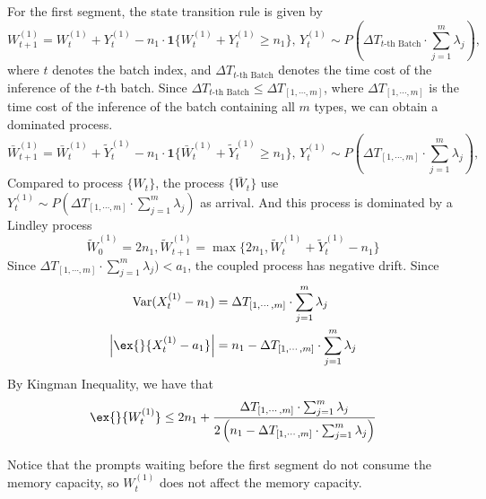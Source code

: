 For the first segment, the state transition rule is given by
$$ W_{t+1}^{(1)} =  W_t^{(1)} + Y_t^{(1)} -n_1\cdot  \mathbf{1}\{ W_t^{(1)} + Y_t^{(1)}\geq n_1 \},\, Y_t^{(1)}\sim P(\Delta T_{ t\text{-th Batch} }\cdot \sum_{j=1}^m \lambda_j), $$
where $t$ denotes the batch index, and $\Delta T_{t\text{-th Batch}}$ denotes the time cost of the inference of the $t$-th batch. Since $\Delta T_{t\text{-th Batch}}\leq \Delta T_{[1,\cdots,m]}$, where $\Delta T_{[1,\cdots,m]}$ is the time cost of the inference of the batch containing all $m$ types, we can obtain a dominated process.
$$ \bar{W}_{t+1}^{(1)} =  \bar{W}_t^{(1)} + \tilde{Y}_t^{(1)} -n_1\cdot  \mathbf{1}\{ \bar{W}_t^{(1)} + \tilde{Y}_t^{(1)}\geq n_1 \},\, Y_t^{(1)}\sim P(\Delta T_{ [1,\cdots,m] }\cdot \sum_{j=1}^m \lambda_j), $$
Compared to process $\{W_t\}$, the process $\{ \bar{W}_t \}$ use $Y_t^{(1)}\sim P(\Delta T_{ [1,\cdots,m] }\cdot \sum_{j=1}^m \lambda_j)$ as arrival. And this process is dominated by a Lindley process
$$\tilde{W}_0^{(1)}=2n_1,  \tilde{W}_{t+1}^{(1)}=\max\{2n_1, \tilde{W}_t^{(1)}+\tilde{Y}_t^{(1)}-n_1\}$$
Since $\Delta T_{ [1,\cdots,m] }\cdot \sum_{j=1}^m \lambda_j)<a_1$, the coupled process has negative drift.
Since 
\begin{align*}
    \text{Var}(X_t^{(1)} - n_1) &= \Delta T_{ [1,\cdots,m] }\cdot \sum_{j=1}^m \lambda_j\\
    \left|\ex{}{X_t^{(1)} - a_1}\right| &= n_1 - \Delta T_{ [1,\cdots,m] }\cdot \sum_{j=1}^m \lambda_j
\end{align*}
By Kingman Inequality, we have that
$$\ex{}{W_t^{(1)}}\leq 2n_1 + \frac{\Delta T_{ [1,\cdots,m] }\cdot \sum_{j=1}^m \lambda_j}{2\left( n_1 - \Delta T_{ [1,\cdots,m] }\cdot \sum_{j=1}^m \lambda_j\right)} $$

Notice that the prompts waiting before the first segment do not consume the memory capacity, so $W_t^{(1)}$ does not affect the memory capacity.

